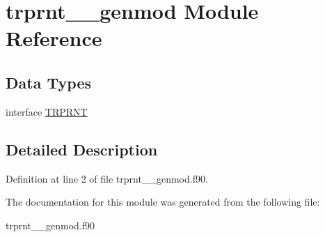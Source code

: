 \hypertarget{classtrprnt____genmod}{\section{trprnt\+\_\+\+\_\+genmod Module Reference}
\label{classtrprnt____genmod}
}
\subsection*{Data Types}
\begin{DoxyCompactItemize}
\item 
interface \hyperlink{interfacetrprnt____genmod_1_1_t_r_p_r_n_t}{T\+R\+P\+R\+N\+T}
\end{DoxyCompactItemize}


\subsection{Detailed Description}


Definition at line 2 of file trprnt\+\_\+\+\_\+genmod.\+f90.



The documentation for this module was generated from the following file\+:\begin{DoxyCompactItemize}
\item 
trprnt\+\_\+\+\_\+genmod.\+f90\end{DoxyCompactItemize}
